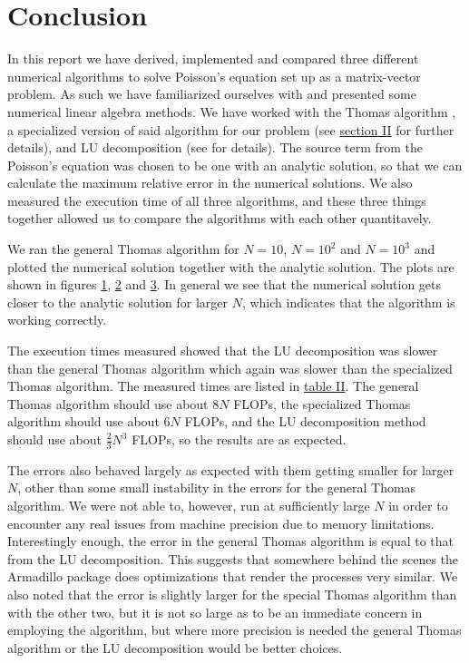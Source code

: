 \documentclass[english,notitlepage,reprint,nofootinbib]{revtex4-1}  %
\begin{document}
\newpage

\section{Conclusion} \label{sec:V}

In this report we have derived, implemented and compared three different numerical algorithms to solve Poisson's equation set up as a matrix-vector problem. As such we have familiarized ourselves with and presented some numerical linear algebra methods. We have worked with the Thomas algorithm \citep{Thomas1949}, a specialized version of said algorithm for our problem (see \hyperref[sec:II]{section II} for further details), and LU decomposition (see \citep{Hjorth-Jensen2018} for details). The source term from the Poisson's equation was chosen to be one with an analytic solution, so that we can calculate the maximum relative error in the numerical solutions. We also measured the execution time of all three algorithms, and these three things together allowed us to compare the algorithms with each other quantitavely. 

We ran the general Thomas algorithm for $N=10$, $N=10^2$ and $N=10^3$ and plotted the numerical solution together with the analytic solution. The plots are shown in figures \hyperref[fig:iv:a:1]{1}, \hyperref[fig:iv:a:2]{2} and \hyperref[fig:iv:a:3]{3}. In general we see that the numerical solution gets closer to the analytic solution for larger $N$, which indicates that the algorithm is working correctly.

The execution times measured showed that the LU decomposition was slower than the general Thomas algorithm which again was slower than the specialized Thomas algorithm. The measured times are listed in \hyperref[table:iv:c:1]{table II}. The general Thomas algorithm should use about $8N$ FLOPs, the specialized Thomas algorithm should use about $6N$ FLOPs, and the LU decomposition method should use about $\frac{2}{3} N^3$ FLOPs, so the results are as expected.

The errors also behaved largely as expected with them getting smaller for larger $N$, other than some small instability in the errors for the general Thomas algorithm. We were not able to, however, run at sufficiently large $N$ in order to encounter any real issues from machine precision due to memory limitations. Interestingly enough, the error in the general Thomas algorithm is equal to that from the LU decomposition. This suggests that somewhere behind the scenes the Armadillo package does optimizations that render the processes very similar. We also noted that the error is slightly larger for the special Thomas algorithm than with the other two, but it is not so large as to be an immediate concern in employing the algorithm, but where more precision is needed the general Thomas algorithm or the LU decomposition would be better choices.
\end{document}
